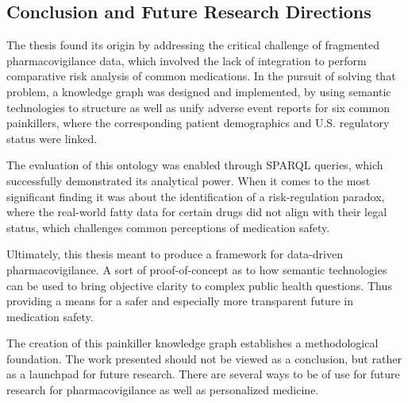 \subsection{Conclusion and Future Research Directions}
The thesis found its origin by addressing the critical challenge of fragmented pharmacovigilance data, which involved the lack of integration to perform comparative risk analysis of common medications. In the pursuit of solving that problem, a knowledge graph was designed and implemented, by using semantic technologies to structure as well as unify adverse event reports for six common painkillers, where the corresponding patient demographics and U.S. regulatory status were linked.

The evaluation of this ontology was enabled through SPARQL queries, which successfully demonstrated its analytical power. When it comes to the most significant finding it was about the identification of a risk-regulation paradox, where the real-world fatty data for certain drugs did not align with their legal status, which challenges common perceptions of medication safety.

Ultimately, this thesis meant to produce a framework for data-driven pharmacovigilance. A sort of proof-of-concept as to how semantic technologies can be used to bring objective clarity to complex public health questions. Thus providing a means for a safer and especially more transparent future in medication safety.

The creation of this painkiller knowledge graph establishes a methodological foundation. The work presented should not be viewed as a conclusion, but rather as a launchpad for future research. There are several ways to be of use for future research for pharmacovigilance as well as personalized medicine.

